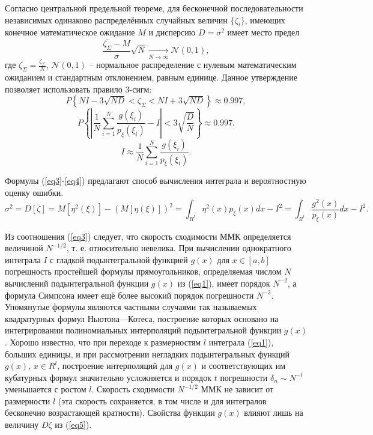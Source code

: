 \documentclass[
11pt,
master, %
subf, %
href, %
colorlinks=true, %
times, %
]{disser}
\begin{document}
Согласно центральной предельной теореме, для бесконечной последовательности независимых одинаково распределённых случайных величин $\{\zeta_i\}$, имеющих конечное математическое ожидание $M$ и дисперсию $D = \sigma^2$ имеет место предел
$$\frac{\overline{\zeta_\Sigma}-M}{\sigma}\sqrt{N} \underset{N\rightarrow \infty}\rightarrow\mathcal{N}(0,1),$$
где $\overline{\zeta_\Sigma} = \frac{\zeta_\Sigma}{N}$, $\mathcal{N}(0,1)$ -- нормальное распределение с нулевым математическим ожиданием и стандартным отклонением, равным единице. Данное утверждение позволяет использовать правило 3-сигм:
$$P\left\{NI-3\sqrt{ND} < \zeta_\Sigma < NI + 3\sqrt{ND}\right\} \approx 0.997,$$
\begin{equation}\label{eq3}
  P\left\{\left|\frac{1}{N}\sum_{i=1}^{N}\frac{g(\xi_i)}{p_{\xi}(\xi_i)}-I\right| < 3\sqrt{\frac{D}{N}}\right\} \approx 0.997.
\end{equation}
\begin{equation}\label{eq4}
  I \approx \frac{1}{N}\sum_{i=1}^{N}\frac{g(\xi_i)}{p_{\xi}(\xi_i)}.
\end{equation}

Формулы (\ref{eq3}-\ref{eq4}) предлагают способ вычисления интеграла и вероятностную оценку ошибки.
\begin{equation}\label{eq5}
  \sigma^2 = D[\zeta] = M[\eta^2(\xi)] - (M[\eta(\xi)])^2 = \int_{R^l} \eta^2(x) p_{\xi}(x)dx - I^2 = \int_{R^l}\frac{g^2(x)}{p_{\xi}(x)}dx - I^2.
\end{equation}

Из соотношения (\ref{eq3}) следует, что скорость сходимости ММК определяется величиной $N^{-1/2}$, т. е. относительно невелика. При вычислении однократного интеграла $I$ с гладкой подынтегральной функцией $g(x)$ для $x \in [a, b]$ погрешность простейшей формулы прямоугольников, определяемая числом $N$ вычислений подынтегральной функции $g(x)$ из (\ref{eq1}), имеет порядок $N^{-2}$, а формула Симпсона имеет ещё более высокий порядок погрешности $N^{-3}$. Упомянутые формулы являются частными случаями так называемых квадратурных формул Ньютона—Котеса, построение которых основано на интегрировании полиномиальных интерполяций подынтегральной функции $g(x)$. Хорошо известно, что при переходе к размерностям $l$ интеграла (\ref{eq1}), больших единицы, и при рассмотрении негладких подынтегральных функций $g(x)$, $x \in R^l$, построение интерполяций для $g(x)$ и соответствующих им кубатурных формул значительно усложняется и порядок $t$ погрешности $\delta_n \sim N^{-t}$ уменьшается с ростом $l$. Скорость сходимости $N^{-1/2}$ ММК не зависит от размерности $l$ (эта скорость сохраняется, в том числе и для интегралов бесконечно возрастающей кратности). Свойства функции $g(x)$ влияют лишь на величину $D\zeta$ из (\ref{eq5}).
\end{document}
